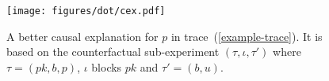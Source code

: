 \begin{figure}
  \vspace*{-0.5cm}
  \begin{center}
    \texttt{[image: figures/dot/cex.pdf]}
  \end{center}
  \vspace{-0.8cm}
  \caption{A better causal explanation for $p$ in
    trace~(\protect\ref{example-trace}). It is based on the
    counterfactual sub-experiment $(\tau, \iota, \tau')$ where
    $\tau = (pk, b, p)$, $\iota$ blocks $pk$ and $\tau' = (b, u)$.}
  \label{fig:cex}
\end{figure}
